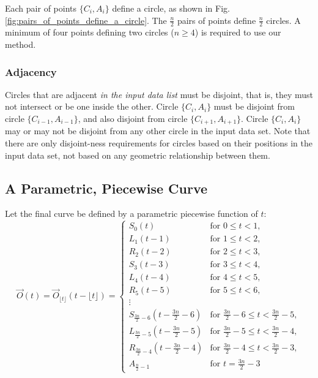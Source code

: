 \documentclass{article}
\begin{document}
Each pair of points \( \{C_i, A_i\} \) define a circle, as shown in Fig. \ref{fig:pairs_of_points_define_a_circle}. The \( \frac{n}{2} \) pairs of points define \( \frac{n}{2} \) circles. A minimum of four points defining two circles (\( n \geq 4 \)) is required to use our method.

\subsubsection{Adjacency}
Circles that are adjacent \textit{in the input data list} must be disjoint, that is, they must not intersect or be one inside the other. Circle \( \{C_i, A_i\} \) must be disjoint from circle \( \{C_{i-1}, A_{i-1}\} \), and also disjoint from circle \( \{C_{i+1}, A_{i+1}\} \). Circle \( \{C_i, A_i\} \) may or may not be disjoint from any other circle in the input data set. Note that there are only disjoint-ness requirements for circles based on their positions in the input data set, not based on any geometric relationship between them.


\subsection{A Parametric, Piecewise Curve}
\label{subsec:definition_of_curve}
Let the final curve be defined by a parametric piecewise function of $t$:
\begin{equation}
    \label{eq:O(t)}
\overrightarrow{O}(t) = \overrightarrow{O}_{\lfloor t \rfloor}(t - \lfloor t \rfloor) = \begin{cases}
S_0(t) & \text{for } 0 \leq t < 1, \\
L_1(t - 1) & \text{for } 1 \leq t < 2, \\
R_2(t - 2) & \text{for } 2 \leq t < 3, \\
S_3(t - 3) & \text{for } 3 \leq t < 4, \\
L_4(t - 4) & \text{for } 4 \leq t < 5, \\
R_5(t - 5) & \text{for } 5 \leq t < 6, \\
\vdots & \\
S_{\frac{3n}{2}-6}(t - \frac{3n}{2}-6) & \text{for } \frac{3n}{2}-6 \leq t < \frac{3n}{2}-5, \\
L_{\frac{3n}{2}-5}(t - \frac{3n}{2}-5) & \text{for } \frac{3n}{2}-5 \leq t < \frac{3n}{2}-4, \\
R_{\frac{3n}{2}-4}(t - \frac{3n}{2}-4) & \text{for } \frac{3n}{2}-4 \leq t < \frac{3n}{2}-3, \\
A_{\frac{n}{2}-1} & \text{for } t = \frac{3n}{2}-3
\end{cases}
\end{equation}
\end{document}
